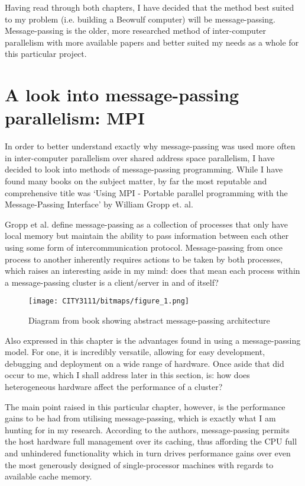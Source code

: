 Having read through both chapters, I have decided that the method best suited to my problem (i.e. building a Beowulf computer) will be message-passing. Message-passing is the older, more researched method of inter-computer parallelism with more available papers and better suited my needs as a whole for this particular project.

\section{A look into message-passing parallelism: MPI}
In order to better understand exactly why message-passing was used more often in inter-computer parallelism over shared address space parallelism, I have decided to look into methods of message-passing programming. While I have found many books on the subject matter, by far the most reputable and comprehensive title was ‘Using MPI - Portable parallel programming with the Message-Passing Interface’ by William Gropp et. al. \cite{gropp_et_al_2014}

Gropp et al. define message-passing as a collection of processes that only have local memory but maintain the ability to pass information between each other using some form of intercommunication protocol. Message-passing from once process to another inherently requires actions to be taken by both processes, which raises an interesting aside in my mind: does that mean each process within a message-passing cluster is a client/server in and of itself?

\begin{figure}[H]
    \texttt{[image: CITY3111/bitmaps/figure\_1.png]}
    \caption{Diagram from book showing abstract message-passing architecture\cite{gropp_et_al_2014}}
    \label{figure_1}
\end{figure}

Also expressed in this chapter is the advantages found in using a message-passing model. For one, it is incredibly versatile, allowing for easy development, debugging and deployment on a wide range of hardware. Once aside that did occur to me, which I shall address later in this section, is: how does heterogeneous hardware affect the performance of a cluster?

The main point raised in this particular chapter, however, is the performance gains to be had from utilising message-passing, which is exactly what I am hunting for in my research. According to the authors, message-passing permits the host hardware full management over its caching, thus affording the CPU full and unhindered functionality which in turn drives performance gains over even the most generously designed of single-processor machines with regards to available cache memory.

